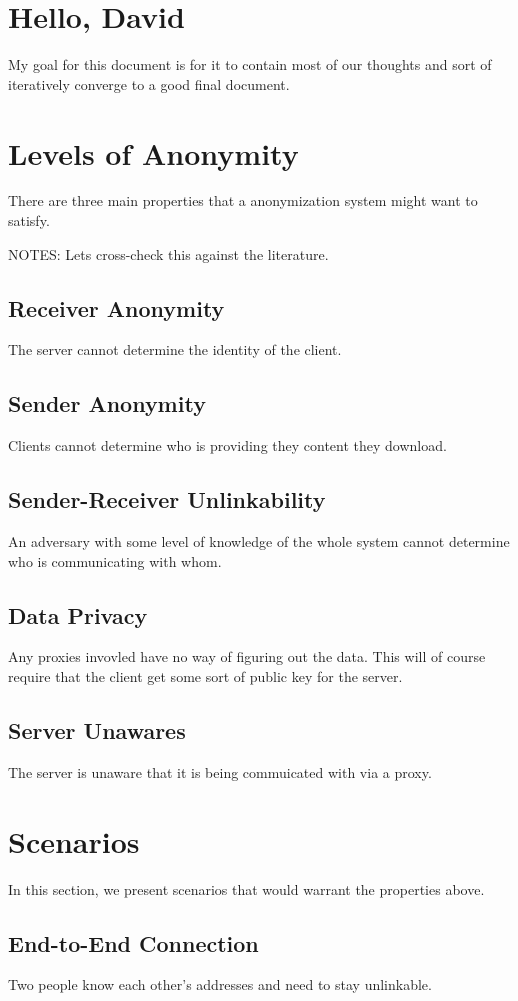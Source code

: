 \documentclass{article}
\begin{document}
\section{Hello, David}
My goal for this document is for it to contain most of our thoughts and sort of iteratively converge to a good final document.


\section{Levels of Anonymity}
There are three main properties that a anonymization system might want to satisfy.

NOTES: Lets cross-check this against the literature.
\subsection{Receiver Anonymity}
The server cannot determine the identity of the client.
\subsection{Sender Anonymity}
Clients cannot determine who is providing they content they download.
\subsection{Sender-Receiver Unlinkability}
An adversary with some level of knowledge of the whole system cannot determine who is communicating with whom.
\subsection{Data Privacy}
Any proxies invovled have no way of figuring out the data.  This will of course require that the client get some sort of public key for the server.
\subsection{Server Unawares}
The server is unaware that it is being commuicated with via a proxy.
\section{Scenarios}
In this section, we present scenarios that would warrant the properties above.
\subsection{End-to-End Connection}
Two people know each other's addresses and need to stay unlinkable.
\end{document}

